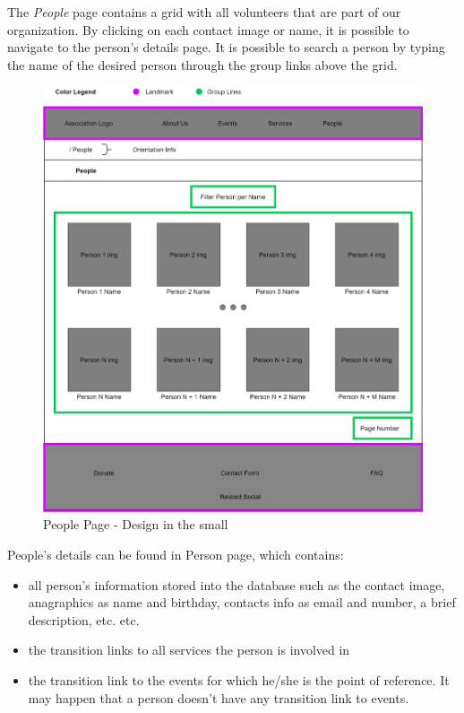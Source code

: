 The \emph{People} page contains a grid with all volunteers that are part of our organization.  By clicking on each contact image or name, it is possible to navigate to the person's details page. It is possible to search a person by typing the name of the desired person  through the group links above the grid. 

\begin{figure}[h!]
		\centering
		\begin{minipage}[b]{1\textwidth}
    			\includegraphics[width=\textwidth]{./assets/people.png}
			\caption{People Page - Design in the small}
		\end{minipage}
	\end{figure}
	\FloatBarrier
\vspace{1cm}
\hspace{-1cm}
People's details can be found in Person page, which contains:
\begin{itemize}
	\item all person's information stored into the database such as the contact image, anagraphics as name and birthday, contacts 			info as email and number,	a brief description, etc. etc.
	\item the transition links to all services the person is involved in
	\item the transition link to the events for which he/she is the point of reference. It may happen that a person doesn't have any 		transition link to events.
\end{itemize} 

